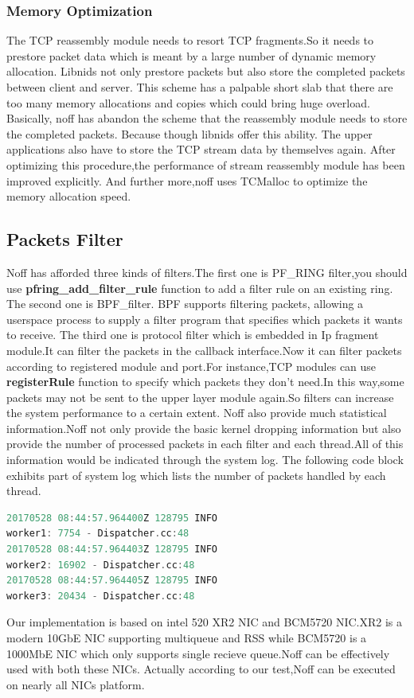 \documentclass[conference]{IEEEtran}
\begin{document}
\subsubsection{Memory Optimization}
The TCP reassembly module needs to resort TCP fragments.So it needs to prestore packet data which is meant by a large number of dynamic memory allocation. Libnids not only prestore packets but also store the completed packets between client and server. This scheme has a palpable short slab that there are too many memory allocations and copies which could bring huge overload.
\newline\indent Basically, noff has abandon the scheme that the reassembly module needs to store the completed packets. Because though libnids offer this ability. The upper applications also have to store the TCP stream data by themselves again. After optimizing this procedure,the performance of stream reassembly module has been improved explicitly.
And further more,noff uses TCMalloc to optimize the memory allocation speed.
\subsection{Packets Filter}
Noff has afforded three kinds of filters.The first one is PF\_RING filter,you should use \textbf{pfring\_add\_filter\_rule} function to add a filter rule on an existing ring.
The second one is BPF\_filter. BPF supports filtering packets, allowing a userspace process to supply a filter program that specifies which packets it wants to receive.
The third one is protocol filter which is embedded in Ip fragment module.It can filter the packets in the callback interface.Now it can filter packets according to registered module and port.For instance,TCP modules can use \textbf{registerRule} function to specify which packets they don't need.In this way,some packets may not be sent to the upper layer module again.So filters can increase the system performance to a certain extent.
\newline\indent Noff also provide much statistical information.Noff not only provide the basic kernel dropping information but also provide the number of processed packets in each filter and each thread.All of this information would be indicated through the system log. The following code block exhibits part of system log which lists the number of packets handled by each thread.
\begin{lstlisting}[language=C]
20170528 08:44:57.964400Z 128795 INFO
worker1: 7754 - Dispatcher.cc:48
20170528 08:44:57.964403Z 128795 INFO
worker2: 16902 - Dispatcher.cc:48
20170528 08:44:57.964405Z 128795 INFO
worker3: 20434 - Dispatcher.cc:48
\end{lstlisting}
\indent Our implementation is based on intel 520 XR2 NIC and BCM5720 NIC.XR2 is a modern 10GbE NIC supporting multiqueue and RSS while BCM5720 is a 1000MbE NIC which only supports single recieve queue.Noff can be effectively used with both these NICs. Actually according to our test,Noff can be executed on nearly all NICs platform.
\end{document}
